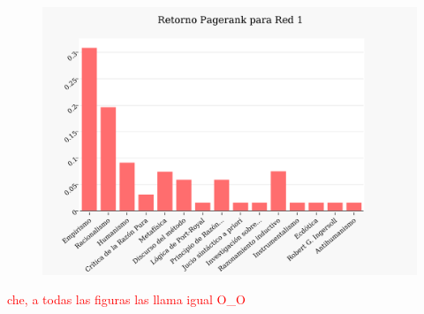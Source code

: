 \documentclass[a4paper]{article}
\begin{document}
\begin{figure}
  \begin{center}
	\includegraphics[scale=0.66]{imagenes/Exp1/PR1}
	\label{fig:pr1}
  \end{center}
\end{figure}
\textcolor{red}{che, a todas las figuras las llama igual O_O}\\
\end{document}
